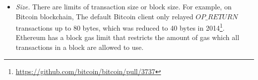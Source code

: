 \begin{itemize}

 
  
  \item \textit{Size.} There are limits of transaction size or block size. For example, on Bitcoin blockchain, The default Bitcoin client only relayed $\mathit{OP\_RETURN}$ transactions up to 80 bytes, which was reduced to 40 bytes in 2014\footnote{\url{https://github.com/bitcoin/bitcoin/pull/3737}}. Ethereum has a block gas limit that restricts the amount of gas which all transactions in a block are allowed to use. 
\end{itemize}


